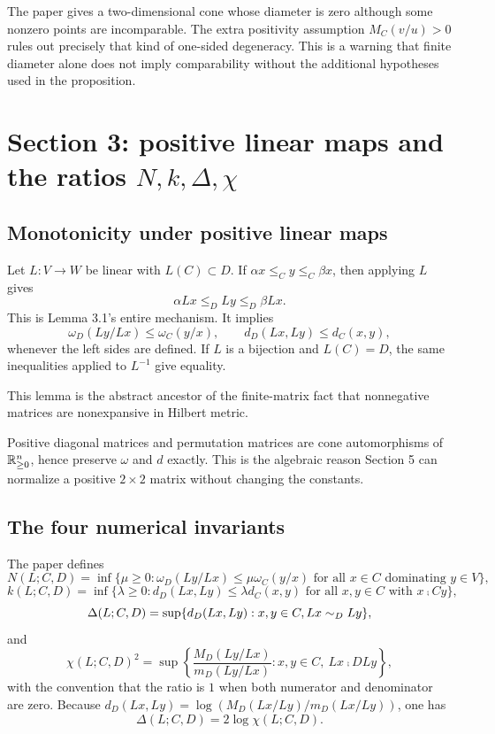 \begin{remark}
The paper gives a two-dimensional cone whose diameter is zero although some nonzero points are incomparable.
The extra positivity assumption $M_C(v/u)>0$ rules out precisely that kind of one-sided degeneracy.
This is a warning that finite diameter alone does not imply comparability without the additional hypotheses used in the proposition.
\end{remark}

\section{Section 3: positive linear maps and the ratios $N,k,\Delta,\chi$}

\subsection{Monotonicity under positive linear maps}
Let $L:V\to W$ be linear with $L(C)\subset D$.
If $\alpha x\le_C y\le_C\beta x$, then applying $L$ gives
\[
  \alpha Lx\le_D Ly\le_D\beta Lx.
\]
This is Lemma 3.1's entire mechanism.
It implies
\[
  \omega_D(Ly/Lx)\le \omega_C(y/x),
  \qquad
  d_D(Lx,Ly)\le d_C(x,y),
\]
whenever the left sides are defined.
If $L$ is a bijection and $L(C)=D$, the same inequalities applied to $L^{-1}$ give equality.

\begin{commentarynotes}
\item This lemma is the abstract ancestor of the finite-matrix fact that nonnegative matrices are nonexpansive in Hilbert metric.
\item Positive diagonal matrices and permutation matrices are cone automorphisms of $\mathbb{R}^n_{\ge0}$, hence preserve $\omega$ and $d$ exactly.  This is the algebraic reason Section 5 can normalize a positive $2\times2$ matrix without changing the constants.
\end{commentarynotes}

\subsection{The four numerical invariants}
The paper defines
\[
N(L;C,D)=\inf\{\mu\ge0:
  \omega_D(Ly/Lx)\le \mu\omega_C(y/x)
  \text{ for all }x\in C\text{ dominating }y\in V\},
\]
\[
k(L;C,D)=\inf\{\lambda\ge0:
  d_D(Lx,Ly)\le \lambda d_C(x,y)
  \text{ for all }x,y\in C\text{ with }x\comp C y\},
\]
\[
\Delta(L;C,D)=\sup\{d_D(Lx,Ly):x,y\in C,\\ Lx\sim_{D} Ly\},
\]
and
\[
\chi(L;C,D)^2=\sup\left\{\frac{M_D(Ly/Lx)}{m_D(Ly/Lx)}:x,y\in C,
  \ Lx\comp D Ly\right\},
\]
with the convention that the ratio is $1$ when both numerator and denominator are zero.
Because $d_D(Lx,Ly)=\log(M_D(Lx/Ly)/m_D(Lx/Ly))$, one has
\[
  \Delta(L;C,D)=2\log\chi(L;C,D).
\]

